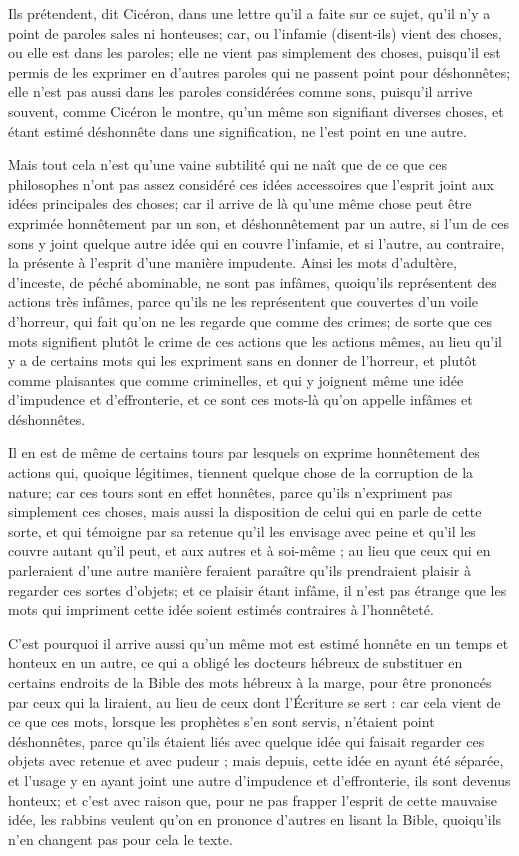 Ils prétendent, dit Cicéron, dans une lettre qu'il a faite sur ce sujet, qu'il n'y a point de paroles sales ni honteuses; car, ou l'infamie (disent-ils) vient des choses, ou elle est dans les paroles; elle ne vient pas simplement des choses, puisqu'il est permis de les exprimer en d'autres paroles qui ne passent point pour déshonnêtes; elle n'est pas aussi dans les paroles considérées comme sons, puisqu'il arrive souvent, comme Cicéron le montre, qu'un même son signifiant diverses choses, et étant estimé déshonnête dans une signification, ne l'est point en une autre.

Mais tout cela n'est qu'une vaine subtilité qui ne naît que de ce que ces philosophes n'ont pas assez considéré ces idées accessoires que l'esprit joint aux idées principales des choses; car il arrive de là qu'une même chose peut être exprimée honnêtement par un son, et déshonnêtement par un autre, si l'un de ces sons y joint quelque autre idée qui en couvre l'infamie, et si l'autre, au contraire, la présente à l'esprit d'une manière impudente. Ainsi les mots d'adultère, d'inceste, de péché abominable, ne sont pas infâmes, quoiqu'ils représentent des actions très infâmes, parce qu'ils ne les représentent que couvertes d'un voile d'horreur, qui fait qu'on ne les regarde que comme des crimes; de sorte que ces mots signifient plutôt le crime de ces actions que les actions mêmes, au lieu qu'il y a de certains mots qui les expriment sans en donner de l'horreur, et plutôt comme plaisantes que comme criminelles, et qui y joignent même une idée d'impudence et d'effronterie, et ce sont ces mots-là qu'on appelle infâmes et déshonnêtes.

Il en est de même de certains tours par lesquels on exprime honnêtement des actions qui, quoique légitimes, tiennent quelque chose de la corruption de la nature; car ces tours sont en effet honnêtes, parce qu'ils n'expriment pas simplement ces choses, mais aussi la disposition de celui qui en parle de cette sorte, et qui témoigne par sa retenue qu'il les envisage avec peine et qu'il les couvre autant qu'il peut, et aux autres et à soi-même ; au lieu que ceux qui en parleraient d'une autre manière feraient paraître qu'ils prendraient plaisir à regarder ces sortes d'objets; et ce plaisir étant infâme, il n'est pas étrange que les mots qui impriment cette idée soient estimés contraires à l'honnêteté.

C'est pourquoi il arrive aussi qu'un même mot est estimé honnête en un temps et honteux en un autre, ce qui a obligé les docteurs hébreux de substituer en certains endroits de la Bible des mots hébreux à la marge, pour être prononcés par ceux qui la liraient, au lieu de ceux dont l'Écriture se sert : car cela vient de ce que ces mots, lorsque les prophètes s'en sont servis, n'étaient point déshonnêtes, parce qu'ils étaient liés avec quelque idée qui faisait regarder ces objets avec retenue et avec pudeur ; mais depuis, cette idée en ayant été séparée, et l'usage y en ayant joint une autre d'impudence et d'effronterie, ils sont devenus honteux; et c'est avec raison que, pour ne pas frapper l'esprit de cette mauvaise idée, les rabbins veulent qu'on en prononce d'autres en lisant la Bible, quoiqu'ils n'en changent pas pour cela le texte.

